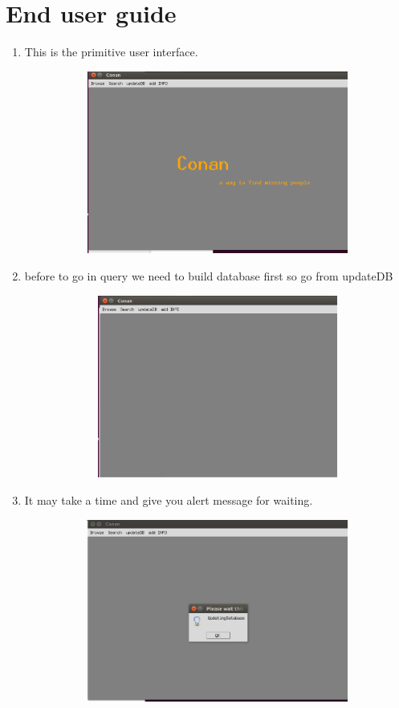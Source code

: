 \documentclass[pdftex,10pt,a4paper,oneside]{article}
\begin{document}
	\section{End user guide}
	\begin{enumerate}
		\item This is the primitive user interface.
			\begin{figure}[H]
			\centering
			\includegraphics[width=120mm,height=60mm]{fig/00.png}
		\end{figure}
		
	\pagebreak
	\item before to go in query we need to build database first so go from  updateDB
			
		\begin{figure}[H]
		\centering
		\includegraphics[width=120mm,height=60mm]{fig/01.png}
	\end{figure}
		\item 	It may take a time and give you alert message for waiting.
	\begin{figure}[H]
	\centering
	\includegraphics[width=120mm,height=60mm]{fig/2.png}
\end{figure}
	

\end{enumerate}
\end{document}

